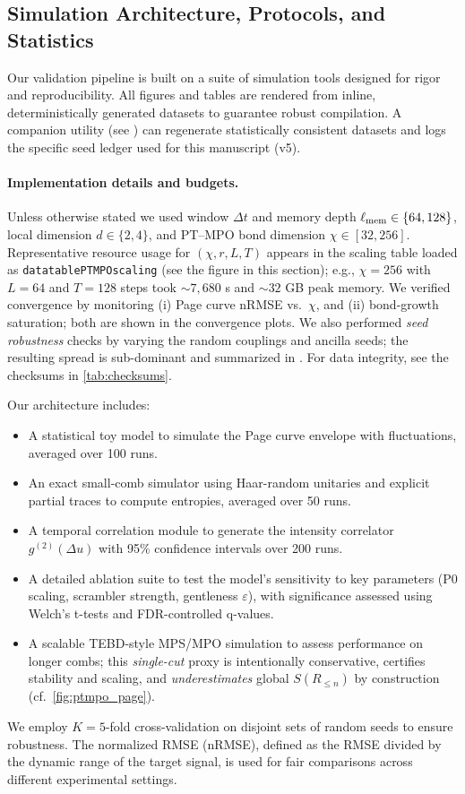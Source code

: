 \documentclass[a4paper,11pt]{article}
\theoremstyle{plain}
\theoremstyle{definition}
\theoremstyle{remark}
\begin{document}
\subsection{Simulation Architecture, Protocols, and Statistics}
\label{sec:methods}
Our validation pipeline is built on a suite of simulation tools designed for rigor and reproducibility. All figures and tables are rendered from inline, deterministically generated datasets to guarantee robust compilation. A companion utility (see ) can regenerate statistically consistent datasets and logs the specific seed ledger used for this manuscript (v5).

\paragraph{Implementation details and budgets.}
Unless otherwise stated we used window \(\Delta t\) and memory depth \(\ell_{\rm mem}\in\{64,128\}\), local dimension \(d\in\{2,4\}\), and PT--MPO bond dimension \(\chi\in[32,256]\).
Representative resource usage for \((\chi,r,L,T)\) appears in the scaling table loaded as \texttt{datatablePTMPOscaling} (see the figure in this section);
e.g., \(\chi=256\) with \(L=64\) and \(T=128\) steps took \(\sim 7{,}680\) s and \(\sim 32\) GB peak memory.
We verified convergence by monitoring (i) Page curve nRMSE vs.\ \(\chi\), and (ii) bond-growth saturation; both are shown in the convergence plots.
We also performed \emph{seed robustness} checks by varying the random couplings and ancilla seeds; the resulting spread is sub-dominant and summarized in .
For data integrity, see the checksums in \cref{tab:checksums}.

Our architecture includes:
\begin{itemize}[leftmargin=*]
    \item A statistical toy model to simulate the Page curve envelope with fluctuations, averaged over 100 runs.
    \item An exact small-comb simulator using Haar-random unitaries and explicit partial traces to compute entropies, averaged over 50 runs.
    \item A temporal correlation module to generate the intensity correlator $g^{(2)}(\Delta u)$ with 95\% confidence intervals over 200 runs.
    \item A detailed ablation suite to test the model's sensitivity to key parameters (P0 scaling, scrambler strength, gentleness $\varepsilon$), with significance assessed using Welch's t-tests and FDR-controlled q-values.
    \item A scalable TEBD-style MPS/MPO simulation to assess performance on longer combs; this \emph{single-cut} proxy is intentionally conservative, certifies stability and scaling, and \emph{underestimates} global $S(R_{\le n})$ by construction (cf.~\cref{fig:ptmpo_page}).
\end{itemize}
We employ $K=5$-fold cross-validation on disjoint sets of random seeds to ensure robustness. The normalized RMSE (nRMSE), defined as the RMSE divided by the dynamic range of the target signal, is used for fair comparisons across different experimental settings.
\end{document}
